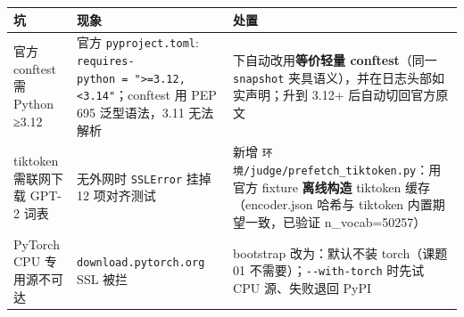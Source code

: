 \documentclass[
  chinese,
  11pt,
]{ctexart}
\newcounter{none} %
\begin{document}
{\def\LTcaptype{none} %
\begin{longtable}[]{@{}
  >{\raggedright\arraybackslash}p{}
  >{\raggedright\arraybackslash}p{}
  >{\raggedright\arraybackslash}p{}@{}}
\toprule\noalign{}
\begin{minipage}[b]{\linewidth}\raggedright
坑
\end{minipage} & \begin{minipage}[b]{\linewidth}\raggedright
现象
\end{minipage} & \begin{minipage}[b]{\linewidth}\raggedright
处置
\end{minipage} \\
\midrule\noalign{}
\endhead
\bottomrule\noalign{}
\endlastfoot
官方 conftest 需 Python ≥3.12 & 官方 \texttt{pyproject.toml}: \texttt{requires-python\ =\ "\textgreater{}=3.12,\textless{}3.14"}；conftest 用 PEP 695 泛型语法，3.11 无法解析 & 3.11 下自动改用\textbf{等价轻量 conftest}（同一 \texttt{snapshot} 夹具语义），并在日志头部如实声明；升到 3.12+ 后自动切回官方原文 \\
tiktoken 需联网下载 GPT-2 词表 & 无外网时 \texttt{SSLError} 挂掉 12 项对齐测试 & 新增 \texttt{环境/judge/prefetch\_tiktoken.py}：用官方 fixture \textbf{离线构造} tiktoken 缓存（encoder.json 哈希与 tiktoken 内置期望一致，已验证 n\_vocab=50257） \\
PyTorch CPU 专用源不可达 & \texttt{download.pytorch.org} SSL 被拦 & bootstrap 改为：默认不装 torch（课题01 不需要）；\texttt{-\/-with-torch} 时先试 CPU 源、失败退回 PyPI \\
\end{longtable}
}
\end{document}
